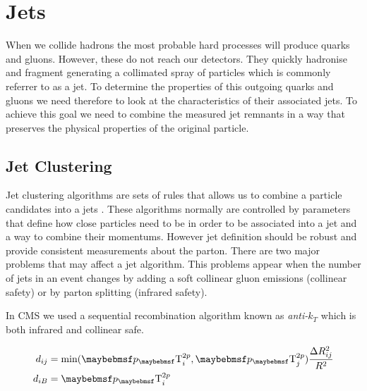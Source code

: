
\section{Jets}


When we collide hadrons the most probable hard processes will produce quarks and gluons. However, these do not reach our detectors. They quickly hadronise and fragment generating a collimated spray of particles which is commonly referrer to as a jet. To determine the properties of this outgoing quarks and gluons we need therefore to look at the characteristics of their associated jets. To achieve this goal we need to combine the measured jet remnants in a way that preserves the physical properties of the original particle.

\subsection{Jet Clustering}


Jet clustering algorithms are sets of rules that allows us to combine a particle candidates into a jets \cite{ARTICLE:TowardsJetography}. These algorithms normally are controlled by parameters that define how close particles need to be in order to be associated into a jet and a way to combine their momentums. However jet definition should be robust and provide consistent measurements about the parton. There are two major problems that may affect a jet algorithm. This problems appear when the number of jets in an event changes by adding a soft collinear gluon emissions (collinear safety) or by parton splitting (infrared safety). 

In \gls{CMS} we used a sequential recombination algorithm known as \textit{anti-$k_T$} \cite{ARTICLE:AntiKtAlgorithm} which is both infrared and collinear safe. 

\begin{align}
d_{ij} &= \text{min}({\pT}_{i}^{2p},{\pT}_{j}^{2p})\frac{\Delta R_{ij}^{2}}{R^{2}} \\
d_{iB} &= {\pT}_{i}^{2p}\, 
\end{align}


\cite{ARTICLE:FastJetUserManual} %

